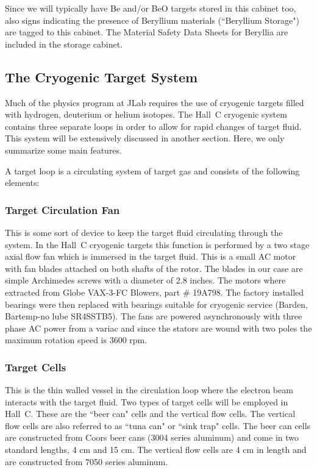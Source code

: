 Since we will typically have
Be and/or BeO targets stored in this cabinet too, also signs indicating
the presence of Beryllium materials (``Beryllium Storage")
are tagged to this cabinet. The Material
Safety Data Sheets for Beryllia are included in the storage cabinet.


\subsection{The Cryogenic Target System}

Much of the physics program at JLab requires the use of cryogenic targets
filled with hydrogen, deuterium or helium isotopes. The Hall~C cryogenic
system contains three separate loops in order to allow for rapid changes
of target fluid.  This system will be extensively discussed in
another section.  Here, we only summarize some main features.

A target loop is a circulating system of target gas and consists of the following
elements:

\subsubsection{Target Circulation Fan} This is some sort of device to keep
the target fluid circulating through the system. In the Hall~C cryogenic
targets this function is performed by a two stage axial flow fan which is
immersed in the target fluid. This is a small AC motor with fan blades attached
on both shafts of the rotor. The blades in our case are simple Archimedes
screws with a diameter of 2.8 inches. The motors where extracted from Globe
VAX-3-FC Blowers, part $\#$ 19A798. The factory installed
bearings were then replaced with bearings suitable for cryogenic service
(Barden, Bartemp-no lube SR4SSTB5). The fans are powered asynchronously
with three phase AC power from a variac and since the stators are wound with
two poles the maximum rotation speed is 3600 rpm.
\subsubsection{Target Cells} This is the thin walled vessel in the circulation loop
where the electron beam interacts with the target fluid. Two types
of target cells will be employed in Hall~C. These are the ``beer can" cells
and the vertical flow cells. The vertical flow cells are also referred
to as ``tuna can" or ``sink trap" cells.
The beer can cells are constructed from Coors beer cans (3004 series aluminum)
and come in two standard lengths, 4 cm and 15 cm.
The vertical flow cells are 4 cm in length and are constructed from 7050
series aluminum.
